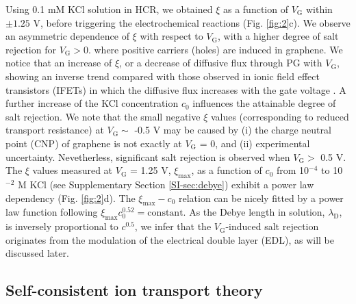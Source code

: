 \documentclass[journal=nalefd,email=true, hyperref=true, keywords=false]{achemso}
\newcommand{\Fig}{Fig.}
\begin{document}
Using 0.1 mM KCl solution in HCR, we obtained $\xi$ as a function of
$V_{\mathrm{G}}$ within $\pm1.25$ V, before triggering the
electrochemical reactions (\Fig{} \ref{fig:2}c). We observe an
asymmetric dependence of $\xi$ with respect to $V_{\mathrm{G}}$, with
a higher degree of salt rejection for $V_{\mathrm{G}}>0$. where
positive carriers (holes) are induced in graphene. We notice that an
increase of $\xi$, or a decrease of diffusive flux through PG with
$V_{\mathrm{G}}$, showing an inverse trend compared with those
observed in ionic field effect transistors (IFETs) in which the
diffusive flux increases with the gate voltage
\cite{Nam_2009,Cheng_2018}. A further increase of the KCl
concentration $c_{0}$ influences the attainable degree of salt
rejection. 
{
We note that the small negative $\xi$ values (corresponding to reduced transport resistance) at $V_{\mathrm{G}} \sim{}$ -0.5 V
may be caused by (i) the charge neutral point (CNP) of graphene is not exactly at $V_{\mathrm{G}}$ = 0, and (ii) experimental uncertainty.
Nevetherless, significant salt rejection is observed when $V_{\mathrm{G}}>$ 0.5 V.
}
The $\xi$ values measured at $V_{\mathrm{G}}$ = 1.25 V,
$\xi_{\mathrm{max}}$, as a function of $c_{0}$ from 10$^{-4}$ to
10$^{-2}$ M KCl (see Supplementary Section \ref{SI-sec:debye}) exhibit
a power law dependency (\Fig{} \ref{fig:2}d). The
$\xi_{\mathrm{max}}-c_{0}$ relation can be nicely fitted by a power
law function following
$\xi_{\mathrm{max}} c_{0}^{0.52} = \mathrm{constant}$. As the Debye
length in solution, $\lambda_{\mathrm{D}}$, is inversely proportional
to $c^{0.5}$, we infer that the $V_{\mathrm{G}}$-induced salt
rejection originates from the modulation of the electrical double
layer (EDL), as will be discussed later.

\subsection{Self-consistent ion transport theory}
\label{sec:theory}
\end{document}
